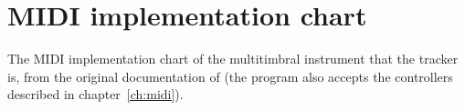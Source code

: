\chapter{MIDI implementation chart}\label{app:midi}

The MIDI implementation chart of the multitimbral instrument that the tracker is, from the original documentation of \RMT{} (the
program also accepts the controllers described in chapter~\ref{ch:midi}).

{\scriptsize

}
